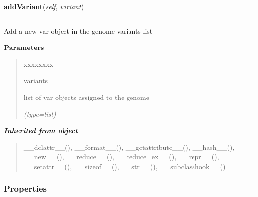     \label{script-phyloFixedVar:genome:addVariant}

    \vspace{0.5ex}

\hspace{.8\funcindent}\begin{boxedminipage}{\funcwidth}

    \raggedright \textbf{addVariant}(\textit{self}, \textit{variant})

    \vspace{-1.5ex}

    \rule{\textwidth}{0.5\fboxrule}
\setlength{\parskip}{2ex}
    Add a new var object in the genome variants list

\setlength{\parskip}{1ex}
      \textbf{Parameters}
      \vspace{-1ex}

      \begin{quote}
        \begin{Ventry}{xxxxxxxx}

          \item[variants]

          list of var objects assigned to the genome

            {\it (type=list)}

        \end{Ventry}

      \end{quote}

    \end{boxedminipage}


\large{\textbf{\textit{Inherited from object}}}

\begin{quote}
\_\_delattr\_\_(), \_\_format\_\_(), \_\_getattribute\_\_(), \_\_hash\_\_(), \_\_new\_\_(), \_\_reduce\_\_(), \_\_reduce\_ex\_\_(), \_\_repr\_\_(), \_\_setattr\_\_(), \_\_sizeof\_\_(), \_\_str\_\_(), \_\_subclasshook\_\_()
\end{quote}


  \subsubsection{Properties}


